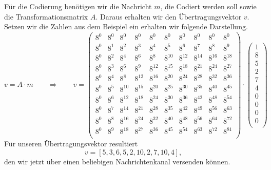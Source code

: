 Für die Codierung benötigen wir die Nachricht $m$, die Codiert werden soll sowie die Transformationsmatrix $A$. Daraus erhalten wir den Übertragungsvektor $v$. Setzen wir die Zahlen aus dem Beispiel ein erhalten wir folgende Darstellung.
\[
v = A \cdot m \qquad \Rightarrow \qquad v = \begin{pmatrix}
	8^0&    8^0&    8^0&    8^0&    8^0&    8^0&    8^0&    8^0&    8^0&    8^0\\
	8^0&	8^1&	8^2&	8^3&	8^4&	8^5&	8^6&	8^7&    8^8&	8^9\\
	8^0&	8^2&	8^4&	8^6&	8^8& 8^{10}& 8^{12}& 8^{14}& 8^{16}& 8^{18}\\
	8^0&	8^3&	8^6&	8^9& 8^{12}& 8^{15}& 8^{18}& 8^{21}& 8^{24}& 8^{27}\\
	8^0&	8^4&	8^8& 8^{12}& 8^{16}& 8^{20}& 8^{24}& 8^{28}& 8^{32}& 8^{36}\\
	8^0&	8^5& 8^{10}& 8^{15}& 8^{20}& 8^{25}& 8^{30}& 8^{35}& 8^{40}& 8^{45}\\
	8^0&	8^6& 8^{12}& 8^{18}& 8^{24}& 8^{30}& 8^{36}& 8^{42}& 8^{48}& 8^{54}\\
	8^0&	8^7& 8^{14}& 8^{21}& 8^{28}& 8^{35}& 8^{42}& 8^{49}& 8^{56}& 8^{63}\\
	8^0&	8^8& 8^{16}& 8^{24}& 8^{32}& 8^{40}& 8^{48}& 8^{56}& 8^{64}& 8^{72}\\
	8^0&	8^9& 8^{18}& 8^{27}& 8^{36}& 8^{45}& 8^{54}& 8^{63}& 8^{72}& 8^{81}\\
\end{pmatrix}
\cdot
\begin{pmatrix}
	1 \\ 8 \\ 5 \\ 2 \\ 7 \\ 4 \\ 0 \\ 0 \\ 0 \\ 0 \\
\end{pmatrix}
\]
Für unseren Übertragungsvektor resultiert
\[
v = [5,3,6,5,2,10,2,7,10,4],
\]
den wir jetzt über einen beliebigen Nachrichtenkanal versenden können.
